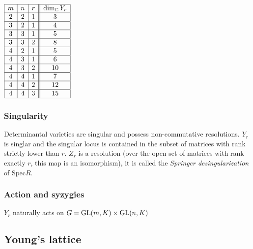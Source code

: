             \begin{table}[H]
                \centering
                $
                \begin{array}{|c|c|c||c|}
                    \hline
                    m & n & r & \dim_{\mathbb{C}} Y_r \\ \hline
                    2 & 2 & 1 & 3 \\ \hline
                    3 & 2 & 1 & 4 \\ \hline
                    3 & 3 & 1 & 5 \\ \hline
                    3 & 3 & 2 & 8 \\ \hline
                    4 & 2 & 1 & 5 \\ \hline
                    4 & 3 & 1 & 6 \\ \hline
                    4 & 3 & 2 & 10 \\ \hline
                    4 & 4 & 1 & 7 \\ \hline
                    4 & 4 & 2 & 12 \\ \hline
                    4 & 4 & 3 & 15 \\ \hline
                \end{array}
                $
            \end{table}

        \subsubsection{Singularity}
        
            Determinantal varieties are singular and possess non-commutative resolutions. $Y_r$ is singlar and the singular locus is contained in the subset of matrices with rank strictly lower than $r$. $Z_r$ is a resolution (over the open set of matrices with rank exactly $r$, this map is an isomorphism), it is called the \emph{Springer desingularization} of $\text{Spec}R$.

        \subsubsection{Action and syzygies}

            $Y_r$ naturally acts on $G=\text{GL}(m,K)\times\text{GL}(n,K)$

        \subsection{Young's lattice}


